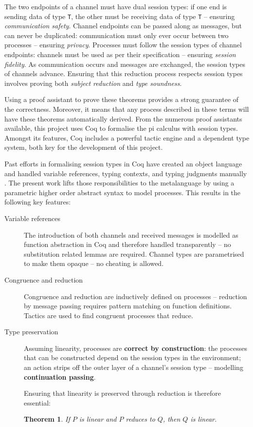 \documentclass{mproj}
\newtheorem{theorem}{Theorem}
\begin{document}
The two endpoints of a channel must have dual session types: if one end is
sending data of type \texttt{T}, the other must be receiving data of type
\texttt{T} -- ensuring \textit{communication safety}. Channel endpoints can be
passed along as messages, but can never be duplicated: communication must only
ever occur between two processes -- ensuring \textit{privacy}.  Processes must
follow the session types of channel endpoints: channels must be used as per
their specification -- ensuring \textit{session fidelity}. As communication
occurs and messages are exchanged, the session types of channels advance.
Ensuring that this reduction process respects session types involves proving
both \textit{subject reduction} and \textit{type soundness}. \cite{Dardha2016m}

Using a proof assistant to prove these theorems provides a strong guarantee of
the correctness. Moreover, it means that any process described in these terms
will have these theorems automatically derived. From the numerous proof
assistants available, this project uses Coq to formalise the pi calculus with
session types. Amongst its features, Coq includes a powerful tactic engine and a
dependent type system, both key for the development of this project.

Past efforts in formalising session types in Coq have created an object language
and handled variable references, typing contexts, and typing judgments manually
\cite{Dilmore2019}. The present work lifts those responsibilities to the
metalanguage by using a parametric higher order abstract syntax to model
processes. This results in the following key features:

\begin{description}
    \item [Variable references]
        The introduction of both channels and received messages is modelled as
        function abstraction in Coq and therefore handled transparently -- no
        substitution related lemmas are required. Channel types are parametrised
        to make them opaque -- no cheating is allowed.

    \item [Congruence and reduction]
        Congruence and reduction are inductively defined on processes --
        reduction by message passing requires pattern matching on function
        definitions. Tactics are used to find congruent processes that reduce.

    \item [Type preservation]
        Assuming linearity, processes are \textbf{correct by construction}:
        the processes that can be constructed depend on the session types in the
        environment; an action strips off the outer layer of a channel's session
        type -- modelling \textbf{continuation passing}.

        Ensuring that linearity is preserved through reduction is therefore
        essential:
        \begin{theorem}
        If $P$ is linear and $P$ reduces to $Q$, then $Q$ is linear.
        \end{theorem}
\end{description}
\end{document}
